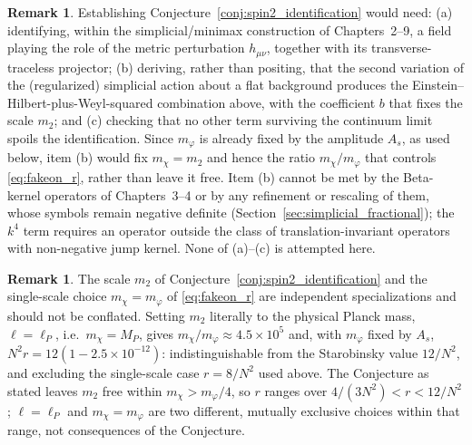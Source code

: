 \documentclass[11pt,a4paper,reqno]{amsart}
\theoremstyle{definition}
\newtheorem{remark}[theorem]{Remark}
\numberwithin{equation}{section}
\begin{document}
\begin{remark}
Establishing Conjecture~\ref{conj:spin2_identification} would need: (a) identifying, within the simplicial/minimax construction of Chapters~2--9, a field playing the role of the metric perturbation $h_{\mu\nu}$, together with its transverse-traceless projector; (b) deriving, rather than positing, that the second variation of the (regularized) simplicial action about a flat background produces the Einstein--Hilbert-plus-Weyl-squared combination above, with the coefficient $b$ that fixes the scale $m_2$; and (c) checking that no other term surviving the continuum limit spoils the identification. Since $m_\varphi$ is already fixed by the amplitude $A_s$, as used below, item (b) would fix $m_\chi = m_2$ and hence the ratio $m_\chi/m_\varphi$ that controls \eqref{eq:fakeon_r}, rather than leave it free. Item (b) cannot be met by the Beta-kernel operators of Chapters~3--4 or by any refinement or rescaling of them, whose symbols remain negative definite (Section~\ref{sec:simplicial_fractional}); the $k^4$ term requires an operator outside the class of translation-invariant operators with non-negative jump kernel. None of (a)--(c) is attempted here.
\end{remark}

\begin{remark}
The scale $m_2$ of Conjecture~\ref{conj:spin2_identification} and the single-scale choice $m_\chi = m_\varphi$ of \eqref{eq:fakeon_r} are independent specializations and should not be conflated. Setting $m_2$ literally to the physical Planck mass, $\ell = \ell_P$, i.e.\ $m_\chi = M_P$, gives $m_\chi/m_\varphi \approx 4.5 \times 10^5$ and, with $m_\varphi$ fixed by $A_s$, $N^2 r = 12(1 - 2.5\times 10^{-12})$: indistinguishable from the Starobinsky value $12/N^2$, and excluding the single-scale case $r = 8/N^2$ used above. The Conjecture as stated leaves $m_2$ free within $m_\chi > m_\varphi/4$, so $r$ ranges over $4/(3N^2) < r < 12/N^2$; $\ell = \ell_P$ and $m_\chi = m_\varphi$ are two different, mutually exclusive choices within that range, not consequences of the Conjecture.
\end{remark}
\end{document}
